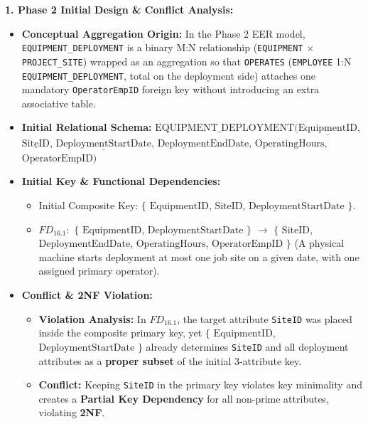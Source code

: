 \documentclass[a4paper,12pt]{report}
\begin{document}
\textbf{1. Phase 2 Initial Design \& Conflict Analysis:}

\begin{itemize}
\item
  \textbf{Conceptual Aggregation Origin:} In the Phase 2 EER model, \texttt{EQUIPMENT\_\allowbreak{}DEPLOYMENT} is a binary M:N relationship (\texttt{EQUIPMENT} \(\times\) \texttt{PROJECT\_\allowbreak{}SITE}) wrapped as an aggregation so that \texttt{OPERATES} (\texttt{EMPLOYEE} 1:N \texttt{EQUIPMENT\_\allowbreak{}DEPLOYMENT}, total on the deployment side) attaches one mandatory \texttt{OperatorEmpID} foreign key without introducing an extra associative table.
\item
  \textbf{Initial Relational Schema:} \(\text{EQUIPMENT\_DEPLOYMENT}(\underline{\text{EquipmentID}}\), \(\underline{\text{SiteID}}\), \(\underline{\text{DeploymentStartDate}}\), \(\text{DeploymentEndDate}\), \(\text{OperatingHours}\), \(\text{OperatorEmpID})\)
\item
  \textbf{Initial Key \& Functional Dependencies:}

  \begin{itemize}
  \item
    Initial Composite Key: \(\{\) \(\text{EquipmentID}\), \(\text{SiteID}\), \(\text{DeploymentStartDate}\) \(\}\).
  \item
    \(FD_{16.1}:\) \(\{\) \(\text{EquipmentID}\), \(\text{DeploymentStartDate}\) \(\}\) \(\rightarrow\) \(\{\) \(\text{SiteID}\), \(\text{DeploymentEndDate}\), \(\text{OperatingHours}\), \(\text{OperatorEmpID}\) \(\}\) (A physical machine starts deployment at most one job site on a given date, with one assigned primary operator).
  \end{itemize}
\item
  \textbf{Conflict \& 2NF Violation:}

  \begin{itemize}
  \item
    \textbf{Violation Analysis:} In \(FD_{16.1}\), the target attribute \texttt{SiteID} was placed inside the composite primary key, yet \(\{\) \(\text{EquipmentID}\), \(\text{DeploymentStartDate}\) \(\}\) already determines \texttt{SiteID} and all deployment attributes as a \textbf{proper subset} of the initial 3-attribute key.
  \item
    \textbf{Conflict:} Keeping \texttt{SiteID} in the primary key violates key minimality and creates a \textbf{Partial Key Dependency} for all non-prime attributes, violating \textbf{2NF}.
  \end{itemize}
\end{itemize}
\end{document}
